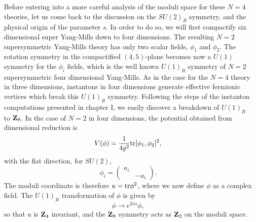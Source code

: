 Before entering into a more careful analysis of the moduli space
for these $N\!=\!4$ theories, let us come back to the discussion
on the $SU(2)_R$ symmetry, and the physical origin of the
parameter $s$. In order to do so, we will first compactify six
dimensional super Yang-Mills down to four dimensions. The
resulting $N\!=\!2$ supersymmetric Yang-Mills theory has only two scalar fields,
$\phi_1$ and $\phi_2$. The rotation symmetry
in the compactified $(4,5)$-plane becomes now a $U(1)$ symmetry
for the $\phi_i$ fields, which is the well known $U(1)_R$
symmetry of $N\!=\!2$ supersymmetric four dimensional Yang-Mills.
As in the case for the $N\!=\!4$ theory in three dimensions,
instantons in four dimensions generate effective fermionic
vertices which break this $U(1)_R$ symmetry. Following the steps
of the instanton computations presented in chapter I, we easily
discover a breakdown of $U(1)_R$ to ${\bf Z}_8$. In the case of
$N\!=\!2$ in four dimensions, the potential obtained from
dimensional reduction is
\begin{equation}
V(\phi) = \frac {1}{4g^2} \hbox {tr}
[\phi_1,\phi_2]^2, 
\label{eq:II24}
\end{equation}
with the flat direction, for $SU(2)$,
\begin{equation}
\phi_i = \left( \begin{array}{cc} a_i   &   \\
					& -a_i 
	\end{array} \right).
\label{eq:II25}
\end{equation}
The moduli coordinate is therefore $u = \hbox {tr} \phi^2$, where
we now define $\phi$ as a complex field. The $U(1)_R$
transformation of $\phi$ is given by
\begin{equation}
\phi \rightarrow e^{2 i \alpha} \phi,
\label{eq:II26}
\end{equation}
so that $u$ is ${\bf Z}_4$ invariant, and the ${\bf Z}_8$
symmetry acts as ${\bf Z}_2$ on the moduli space.
  
